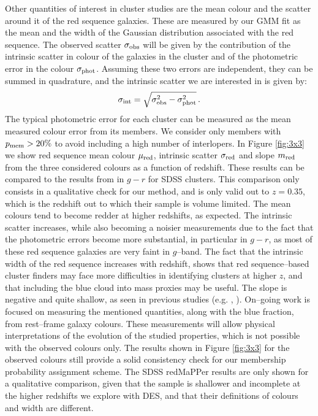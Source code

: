 {Other quantities of interest in cluster studies are the mean colour and the scatter around it of the red sequence galaxies. These are measured by our GMM fit as the mean and the width of the Gaussian distribution associated with the red sequence. The observed scatter $\sigma_{\rm obs}$ will be given by the contribution of the intrinsic scatter in colour of the galaxies in the cluster and of the photometric error in the colour $\sigma_{\rm phot}$. Assuming these two errors are independent, they can be summed in quadrature, and the intrinsic scatter we are interested in is given by:
\begin{equation}
\sigma_{\rm int} =\sqrt{\sigma^2_{\rm obs}-\sigma^2_{\rm phot}}\,.
\end{equation}
The typical photometric error for each cluster can be measured as the mean measured colour error from its members. We consider only members with $p_{\rm mem}>20\%$ to avoid including a high number of interlopers. In Figure \ref{fig:3x3} we show red sequence mean colour $\mu_{\rm red}$, intrinsic scatter $\sigma_{\rm red}$ and slope $m_{\rm red}$ from the three considered colours as a function of redshift. These results can be compared to the results from \citet{redpaper} in $g-r$ for SDSS clusters. This comparison only consists in a qualitative check for our method, and is only valid out to $z=0.35$, which is the redshift out to which their sample is volume limited. The mean colours tend to become redder at higher redshifts, as expected. The intrinsic scatter increases, while also becoming a noisier measurements due to the fact that the photometric errors become more substantial, in particular in $g-r$, as most of these red sequence galaxies are very faint in $g$--band.  The fact that the intrinsic width of the red sequence increases with redshift, shows that red sequence--based cluster finders may face more difficulties in identifying clusters at higher $z$, and that including the blue cloud into mass proxies may be useful. The slope is negative and quite shallow, as seen in previous studies (e.g. \citealt{mei}, \citealt{redpaper}).
On--going work is focused on measuring the mentioned quantities, along with the blue fraction, from rest--frame galaxy colours. These measurements will allow physical interpretations of the evolution of the studied properties, which is not possible with the observed colours only. The results shown in Figure \ref{fig:3x3} for the observed colours still provide a solid consistency check for our membership probability assignment scheme. The SDSS redMaPPer results are only shown for a qualitative comparison, given that the sample is shallower and incomplete at the higher redshifts we explore with DES, and that their definitions of colours and width are different.


}
